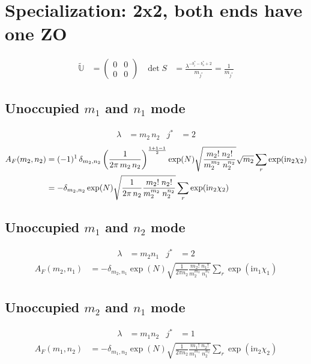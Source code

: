 \documentclass[
	english,
	a4paper,
	fontsize=10pt,
	parskip=half,
	titlepage=true,
	DIV=12,
	final
]{scrreprt}
\newcommand*{\iunit}{\ensuremath{\mathrm{i}}}
\begin{document}
\section{Specialization: 2x2, both ends have one ZO}
\begin{align}
	\tilde{\mathbb{U}}
&=
	\begin{pmatrix}
		0 & 0 \\ 0 & 0
	\end{pmatrix}
&
	\det S
&=
	\frac{ \lambda^{-b_i^* - b_o^* + 2} }{ m_{j^*} }
=
	\frac{1}{m_{j^*}}
\end{align}

\subsection{Unoccupied $m_1$ and $n_1$ mode}
\begin{align}
	\lambda &= m_2 \, n_2
&
	j^* &= 2
\end{align}
\begin{align}
	A_F(m_2, n_2)
&=
	(-1)^1 \, \delta_{m_2,n_2} \, \qty(
		\frac{1}{2\pi \, m_2 \, n_2}
	)^{\frac{1 + 1 - 1}{2}}
	\exp(N)
	\sqrt{\frac
		{ m_2!      \; n_2! }
		{ m_2^{m_2} \; n_2^{n_2} }
	}
	\sqrt{m_2}
	\sum_r
		\exp( \iunit n_2 \chi_2 )
	\\
&=
	-\delta_{m_2,n_2}
	\exp(N)
	\sqrt{
		\frac
			{1}
			{2\pi \, n_2}
		\frac
			{ m_2!      \; n_2! }
			{ m_2^{m_2} \; n_2^{n_2} }
	}
	\sum_r
		\exp( \iunit n_2 \chi_2 )
\end{align}

\subsection{Unoccupied $m_1$ and $n_2$ mode}
\begin{align}
	\lambda &= m_2 n_1
&
	j^* &= 2
\end{align}
\begin{align}
	A_F(m_2, n_1)
&=
	-\delta_{m_2,n_1}
	\exp(N)
	\sqrt{
		\frac
			{1}
			{2\pi n_2}
		\frac
			{ m_2!      \; n_1! }
			{ m_2^{m_2} \; n_1^{n_1} }
	}
	\sum_r
		\exp( \iunit n_1 \chi_1 )
\end{align}

\subsection{Unoccupied $m_2$ and $n_1$ mode}
\begin{align}
	\lambda &= m_1 n_2
&
	j^* &= 1
\end{align}
\begin{align}
	A_F(m_1, n_2)
&=
	-\delta_{m_1,n_2}
	\exp(N)
	\sqrt{
		\frac
			{1}
			{2\pi n_2}
		\frac
			{ m_1!      \; n_2! }
			{ m_1^{m_1} \; n_2^{n_2} }
	}
	\sum_r
		\exp( \iunit n_2 \chi_2 )
\end{align}
\end{document}
